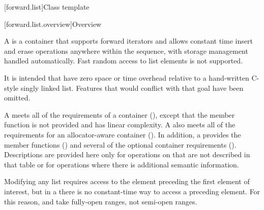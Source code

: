 [forward.list]{Class template }

[forward.list.overview]{Overview}

\pnum
A  is a container that supports forward iterators and allows
constant time insert and erase operations anywhere within the sequence, with storage
management handled automatically. Fast random access to list elements is not supported.
\begin{note}
It is intended that  have zero space or time overhead
relative to a hand-written C-style singly linked list. Features that would conflict with
that goal have been omitted.
\end{note}

\pnum
A  meets all of the requirements of a container
(), except that the 
member function is not provided and  has linear complexity.
A  also meets all of the requirements for an allocator-aware
container (). In addition, a 
provides the  member functions
() and several of the optional
container requirements ().
Descriptions are provided here only for operations on
 that are not described in that table or for operations where there
is additional semantic information.

\pnum
\begin{note}
Modifying any list requires access to the element preceding the first element
of interest, but in a  there is no constant-time way to access a
preceding element.
For this reason,  and 
take fully-open ranges, not semi-open ranges.
\end{note}

